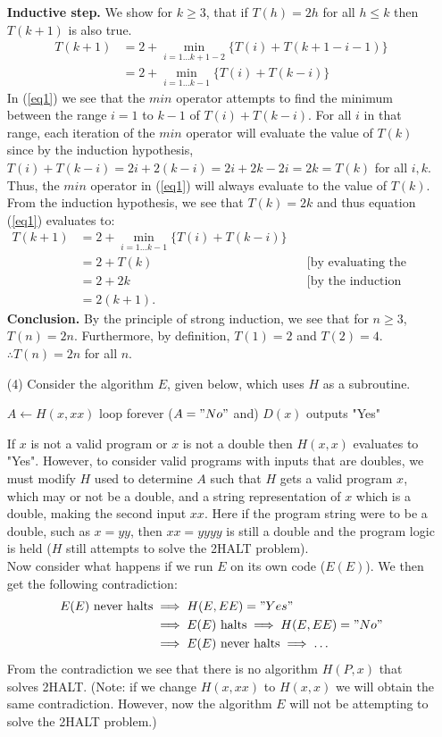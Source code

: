 \documentclass [10pt]{article}
\begin{document}
\begin{enumerate}
	\textbf{Inductive step.} We show for $k \ge 3$, that if $T(h) = 2h$ for all $h \le k$ then $T(k+1)$ is also true.
		\begin{align}
			T(k+1) &= 2 + \min_{i=1 \dots k+1-2} \{T(i) + T(k + 1 - i - 1)\} \nonumber \\
			&= 2 + \min_{i=1 \dots k-1} \{T(i) + T(k - i)\} \label{eq1}
		\end{align}
	In (\ref{eq1}) we see that the $min$ operator attempts to find the minimum between the range $i=1$ to $k-1$ of $T(i) + T(k - i)$. For all $i$ in that range, each iteration of the $min$ operator will evaluate the value of $T(k)$ since by the induction hypothesis, $T(i) + T(k-i) = 2i + 2(k-i) = 2i + 2k - 2i = 2k = T(k)$ for all $i, k$. Thus, the $min$ operator in (\ref{eq1}) will always evaluate to the value of $T(k)$. From the induction hypothesis, we see that $T(k) = 2k$ and thus equation (\ref{eq1}) evaluates to:
		\begin{align} 
			T(k+1) &= 2 + \min_{i=1 \dots k-1} \{T(i) + T(k - i)\} \nonumber \\
			&= 2 + T(k) && \text{[by evaluating the min operator]} \nonumber \\
			&= 2 + 2k && \text{[by the induction hypothesis]} \nonumber \\
			&= 2 (k + 1). \label{eq2}
		\end{align}
	\textbf{Conclusion.} By the principle of strong induction, we see that for $n \ge 3$, $T(n) = 2n$. Furthermore, by definition, $T(1) = 2$ and $T(2) = 4$. $\therefore T(n) = 2n$ for all $n$.
	\item[(4)]Consider the algorithm $E$, given below, which uses $H$ as a subroutine.
		\begin{algorithmic}
				\State $A \gets H(x,xx)$
				 loop forever \Else \: ($A = "No"$ and) $D(x)$ outputs "Yes" \EndIf
			\EndFunction
		\end{algorithmic}
	If $x$ is not a valid program or $x$ is not a double then $H(x,x)$ evaluates to "Yes". However, to consider valid programs with inputs that are doubles, we must modify $H$ used to determine $A$ such that $H$ gets a valid program $x$, which may or not be a double, and a string representation of $x$ which is a double, making the second input $xx$. Here if the program string were to be a double, such as $x=yy$, then $xx=yyyy$ is still a double and the program logic is held ($H$ still attempts to solve the 2HALT problem).\\
	Now consider what happens if we run $E$ on its own code ($E(E)$). We then get the following contradiction:
		\begin{align}
		\text{$E(E)$ never halts} &\implies H(E,EE) = "Yes" \nonumber \\
		&\implies \text{$E(E)$ halts} \implies H(E,EE) = "No" \nonumber \\
		&\implies \text{$E(E)$ never halts} \implies \dots \nonumber
		\end{align}
	From the contradiction we see that there is no algorithm $H(P,x)$ that solves 2HALT. (Note: if we change $H(x,xx)$ to $H(x,x)$ we will obtain the same contradiction. However, now the algorithm $E$ will not be attempting to solve the 2HALT problem.)
\end{enumerate}
\end{document}
